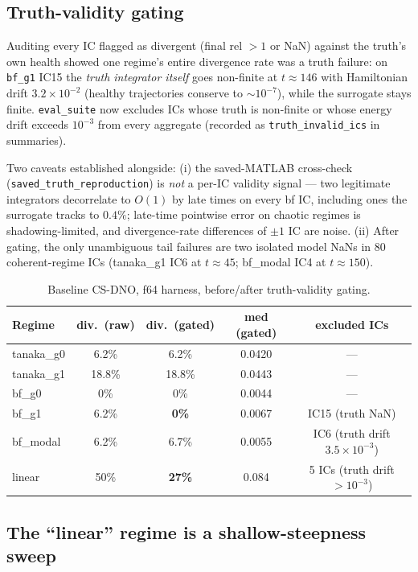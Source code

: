 \documentclass[11pt,letterpaper]{article}
\begin{document}
\subsection{Truth-validity gating}

Auditing every IC flagged as divergent (final rel $>1$ or NaN) against the
truth's own health showed one regime's entire divergence rate was a truth
failure: on \texttt{bf\_g1} IC15 the \emph{truth integrator itself} goes
non-finite at $t\approx 146$ with Hamiltonian drift $3.2\times10^{-2}$ (healthy
trajectories conserve to $\sim 10^{-7}$), while the surrogate stays finite.
\texttt{eval\_suite} now excludes ICs whose truth is non-finite or whose energy
drift exceeds $10^{-3}$ from every aggregate (recorded as
\texttt{truth\_invalid\_ics} in summaries).

Two caveats established alongside: (i) the saved-MATLAB cross-check
(\texttt{saved\_truth\_reproduction}) is \emph{not} a per-IC validity signal ---
two legitimate integrators decorrelate to $O(1)$ by late times on every bf IC,
including ones the surrogate tracks to $0.4\%$; late-time pointwise error on
chaotic regimes is shadowing-limited, and divergence-rate differences of
$\pm 1$ IC are noise. (ii) After gating, the only unambiguous tail failures are
two isolated model NaNs in 80 coherent-regime ICs (tanaka\_g1 IC6 at
$t\approx45$; bf\_modal IC4 at $t\approx150$).

\begin{table}[h]
\centering
\small
\begin{tabular}{lcccc}
\toprule
Regime & div.\ (raw) & div.\ (gated) & med (gated) & excluded ICs \\
\midrule
tanaka\_g0 & 6.2\% & 6.2\% & 0.0420 & --- \\
tanaka\_g1 & 18.8\% & 18.8\% & 0.0443 & --- \\
bf\_g0     & 0\%   & 0\%   & 0.0044 & --- \\
bf\_g1     & 6.2\% & \textbf{0\%} & 0.0067 & IC15 (truth NaN) \\
bf\_modal  & 6.2\% & 6.7\% & 0.0055 & IC6 (truth drift $3.5\times10^{-3}$) \\
linear     & 50\%  & \textbf{27\%} & 0.084 & 5 ICs (truth drift $>10^{-3}$) \\
\bottomrule
\end{tabular}
\caption{Baseline CS-DNO, f64 harness, before/after truth-validity gating.}
\end{table}

\subsection{The ``linear'' regime is a shallow-steepness sweep}
\end{document}
